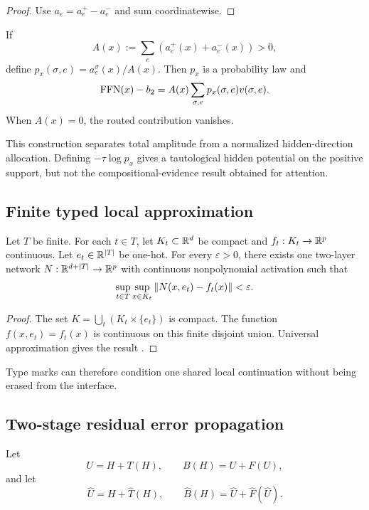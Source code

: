 \begin{proof}
Use $a_e=a_e^+-a_e^-$ and sum coordinatewise.
\end{proof}

\begin{corollary}\label{cor:supp-ffn-amplitude}
If
\[
A(x):=\sum_e(a_e^+(x)+a_e^-(x))>0,
\]
define $p_x(\sigma,e)=a_e^\sigma(x)/A(x)$. Then $p_x$ is a probability law and
\[
\operatorname{FFN}(x)-b_2
=
A(x)\sum_{\sigma,e}p_x(\sigma,e)v(\sigma,e).
\]
When $A(x)=0$, the routed contribution vanishes.
\end{corollary}

This construction separates total amplitude from a normalized hidden-direction allocation. Defining $-\tau\log p_x$ gives a tautological hidden potential on the positive support, but not the compositional-evidence result obtained for attention.

\subsection{Finite typed local approximation}

\begin{theorem}\label{thm:supp-typed-approximation}
Let $T$ be finite. For each $t\in T$, let $K_t\subset\mathbb{R}^d$ be compact and $f_t:K_t\to\mathbb{R}^p$ continuous. Let $e_t\in\mathbb{R}^{|T|}$ be one-hot. For every $\varepsilon>0$, there exists one two-layer network $N:\mathbb{R}^{d+|T|}\to\mathbb{R}^p$ with continuous nonpolynomial activation such that
\[
\sup_{t\in T}\sup_{x\in K_t}\left\lVert N(x,e_t)-f_t(x)\right\rVert<\varepsilon.
\]
\end{theorem}

\begin{proof}
The set $K=\bigcup_t(K_t\times\{e_t\})$ is compact. The function $f(x,e_t)=f_t(x)$ is continuous on this finite disjoint union. Universal approximation gives the result \citep{leshno1993multilayer}.
\end{proof}

Type marks can therefore condition one shared local continuation without being erased from the interface.

\subsection{Two-stage residual error propagation}

Let
\[
U=H+T(H),
\qquad
B(H)=U+F(U),
\]
and let
\[
\widehat U=H+\widehat T(H),
\qquad
\widehat B(H)=\widehat U+\widehat F(\widehat U).
\]

